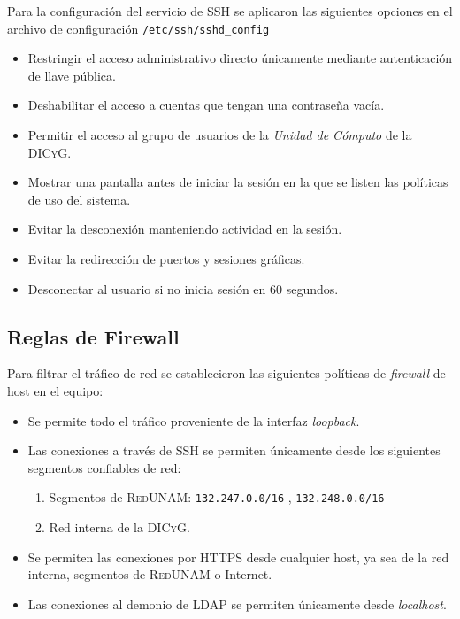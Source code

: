 Para la configuraci\'{o}n del servicio de \textsc{SSH} se aplicaron las siguientes opciones en el archivo de configuraci\'{o}n \texttt{/etc/ssh/sshd\_config}

\begin{itemize}
  \item Restringir el acceso administrativo directo \'{u}nicamente mediante autenticaci\'{o}n de llave p\'{u}blica.
  \item Deshabilitar el acceso a cuentas que tengan una contrase\~{n}a vac\'{i}a.
  \item Permitir el acceso al grupo de usuarios de la \textit{Unidad de C\'{o}mputo} de la \textsc{DICyG}.
  \item  Mostrar una pantalla antes de iniciar la sesi\'{o}n en la que se listen las pol\'{i}ticas de uso del sistema.
  \item Evitar la desconexi\'{o}n manteniendo actividad en la sesi\'{o}n.
  \item Evitar la redirecci\'{o}n de puertos y sesiones gr\'{a}ficas.
  \item Desconectar al usuario si no inicia sesi\'{o}n en 60 segundos.
\end{itemize}

      \subsection {Reglas de Firewall}

Para filtrar el tr\'{a}fico de red se establecieron las siguientes pol\'{i}ticas de \textit{firewall} de host en el equipo:

\begin{itemize}
  \item Se permite todo el tr\'{a}fico proveniente de la interfaz \textit{loopback}.
  \item Las conexiones a trav\'{e}s de \textsc{SSH} se permiten \'{u}nicamente desde los siguientes segmentos confiables de red:
  \begin{enumerate}
    \item Segmentos de \textsc{RedUNAM}: \texttt{132.247.0.0/16} , \texttt{132.248.0.0/16}
    \item Red interna de la \textsc{DICyG}.
  \end{enumerate}
  \item Se permiten las conexiones por \textsc{HTTPS} desde cualquier host, ya sea de la red interna, segmentos de \textsc{RedUNAM} o Internet.
  \item Las conexiones al demonio de \textsc{LDAP} se permiten \'{u}nicamente desde \textit{localhost}.
\end{itemize}

